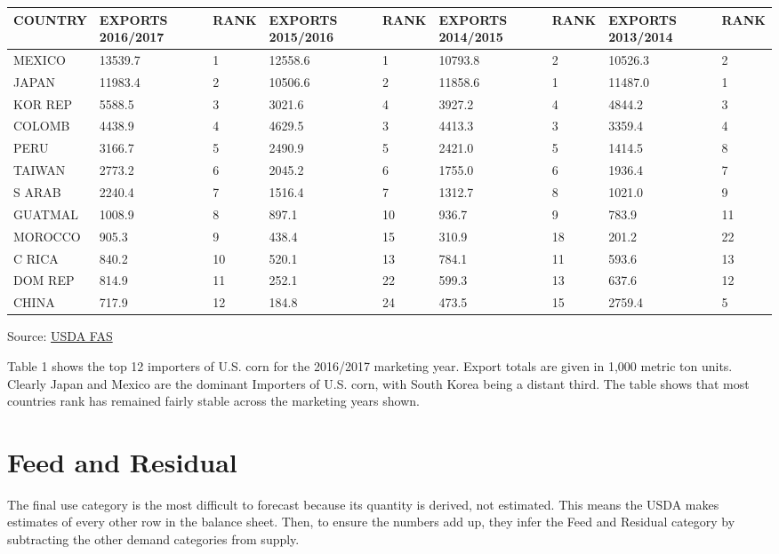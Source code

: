 \documentclass[
]{book}
\begin{document}
\begin{tabular}{l|l|l|l|l|l|l|l|l}
\hline
COUNTRY & EXPORTS 2016/2017 & RANK & EXPORTS 2015/2016 & RANK & EXPORTS 2014/2015 & RANK & EXPORTS 2013/2014 & RANK\\
\hline
MEXICO & 13539.7 & 1 & 12558.6 & 1 & 10793.8 & 2 & 10526.3 & 2\\
\hline
JAPAN & 11983.4 & 2 & 10506.6 & 2 & 11858.6 & 1 & 11487.0 & 1\\
\hline
KOR REP & 5588.5 & 3 & 3021.6 & 4 & 3927.2 & 4 & 4844.2 & 3\\
\hline
COLOMB & 4438.9 & 4 & 4629.5 & 3 & 4413.3 & 3 & 3359.4 & 4\\
\hline
PERU & 3166.7 & 5 & 2490.9 & 5 & 2421.0 & 5 & 1414.5 & 8\\
\hline
TAIWAN & 2773.2 & 6 & 2045.2 & 6 & 1755.0 & 6 & 1936.4 & 7\\
\hline
S ARAB & 2240.4 & 7 & 1516.4 & 7 & 1312.7 & 8 & 1021.0 & 9\\
\hline
GUATMAL & 1008.9 & 8 & 897.1 & 10 & 936.7 & 9 & 783.9 & 11\\
\hline
MOROCCO & 905.3 & 9 & 438.4 & 15 & 310.9 & 18 & 201.2 & 22\\
\hline
C RICA & 840.2 & 10 & 520.1 & 13 & 784.1 & 11 & 593.6 & 13\\
\hline
DOM REP & 814.9 & 11 & 252.1 & 22 & 599.3 & 13 & 637.6 & 12\\
\hline
CHINA & 717.9 & 12 & 184.8 & 24 & 473.5 & 15 & 2759.4 & 5\\
\hline
\end{tabular}

Source: \href{http://apps.fas.usda.gov/export-sales/myrk_rpt.htm}{USDA FAS}

Table 1 shows the top 12 importers of U.S. corn for the 2016/2017
marketing year. Export totals are given in 1,000 metric ton units.
Clearly Japan and Mexico are the dominant Importers of U.S. corn, with
South Korea being a distant third. The table shows that most countries
rank has remained fairly stable across the marketing years shown.

\hypertarget{feed-and-residual}{%
\section{Feed and Residual}\label{feed-and-residual}}

The final use category is the most difficult to forecast because its
quantity is derived, not estimated. This means the USDA makes estimates
of every other row in the balance sheet. Then, to ensure the numbers add
up, they infer the Feed and Residual category by subtracting the other
demand categories from supply.
\end{document}
